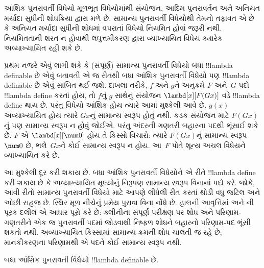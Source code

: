 \documentclass[../../../include/open-logic-section]{subfiles}
\begin{document}

આંશિક પુનરાવર્તી વિધેયો મૂળભૂત વિધેયોમાંથી
સંયોજન, આદિમ પુનરાવર્તન અને અનિયત મર્યાદા
સુધીની શોધક્રિયા દ્વારા મળે છે. સામાન્ય પુનરાવર્તી
વિધેયોથી તેમનો તફાવત એ છે કે અનિયત મર્યાદા સુધીની
શોધમાં વપરાતાં વિધેયો નિયમિત હોવાં જરૂરી નથી.
નિયમિતતાની શરત ન હોવાથી લઘુત્તમીકરણ દ્વારા
વ્યાખ્યાયિત વિધેય ક્યારેક અવ્યાખ્યાયિત રહી શકે છે.

પ્રથમ નજરે એવું લાગી શકે કે (સંપૂર્ણ) સામાન્ય પુનરાવર્તી
વિધેયો બધા !!{lambda definable} છે એવું બતાવતી એ જ
રીતથી બધા આંશિક પુનરાવર્તી વિધેયો પણ
!!{lambda definable} છે એવું સાબિત થઈ જશે.
દાખલા તરીકે, $f$ અને $g$ને અનુક્રમે $F$ અને~$G$
પદો !!{lambda define} કરતાં હોય, તો $f$નું $g$ સાથેનું
સંયોજન $\lambd[x][F (G x)]$ વડે !!{lambda define}
થાય છે. પરંતુ વિધેયો આંશિક હોય ત્યારે આમાં
મુશ્કેલી આવે છે. $g(x)$ અવ્યાખ્યાયિત હોય ત્યારે
$G x$નું સામાન્ય સ્વરૂપ હોતું નથી. કડક સંયોજન માટે
$F (G x)$નું પણ સામાન્ય સ્વરૂપ ન હોવું જોઈએ.
પરંતુ અંદરની ગણતરી બહારના પદથી ભૂંસાઈ શકે છે.
$F$ એ $\lambd[x][\num0]$ હોય તે કિસ્સો
વિચારો: ત્યારે $F (G x)$નું સામાન્ય સ્વરૂપ
$\num0$ છે, ભલે~$Gx$ને કોઈ સામાન્ય સ્વરૂપ ન હોય.
આ~$F$ પોતે શૂન્ય અચલ વિધેયને વ્યાખ્યાયિત કરે છે.

આ મુશ્કેલી દૂર કરી શકાય છે. બધા આંશિક પુનરાવર્તી
વિધેયોને એ રીતે !!{lambda define} કરી શકાય છે કે
અવ્યાખ્યાયિત મૂલ્યોનું નિરૂપણ સામાન્ય સ્વરૂપ
વિનાનાં પદો કરે. જોકે, આવી રીતો સામાન્ય પુનરાવર્તી
વિધેયો માટે આપણે લીધેલી રીત કરતાં થોડી વધુ
જટિલ અને ઓછી સહજ છે. સ્થિર મૂળ નીચેનું પ્રમેય પુરાવા
વિના નોંધે છે. હાલની આવૃત્તિમાં
 અને
ની પૂરક દલીલ એ આધાર પૂરો કરે છે:
ક્લીનીના સંપૂર્ણ પરીક્ષણ પર શોધ અને પરિણામ-ગણતરીને
એક જ પુનરાવર્તી પદમાં જોડવાથી નિષ્ફળ શોધને બહારનો
પરિણામ-પદ ભૂંસી શકતો નથી. અવ્યાખ્યાયિત કિસ્સામાં
સામાન્ય-ક્રમની શોધ ચાલતી જ રહે છે; માનકીકરણના પરિણામથી
એ પદને કોઈ સામાન્ય સ્વરૂપ નથી.

\begin{thm}
  બધા આંશિક પુનરાવર્તી વિધેયો !!{lambda definable} છે.
\end{thm}
\end{document}
